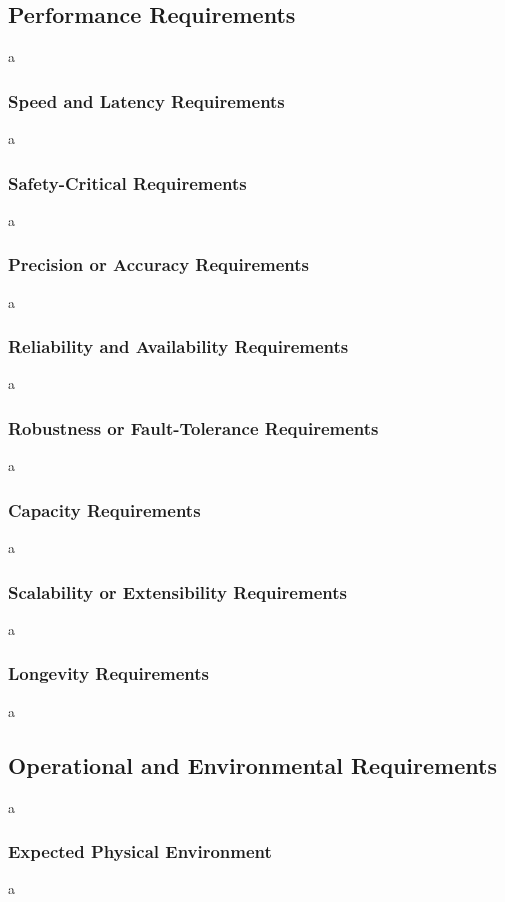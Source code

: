 \documentclass[12pt]{article}
\begin{document}
\subsection{Performance Requirements}
a

\subsubsection{Speed and Latency Requirements}
a

\subsubsection{Safety-Critical Requirements}
a

\subsubsection{Precision or Accuracy Requirements}
a

\subsubsection{Reliability and Availability Requirements}
a

\subsubsection{Robustness or Fault-Tolerance Requirements}
a

\subsubsection{Capacity Requirements}
a

\subsubsection{Scalability or Extensibility Requirements}
a

\subsubsection{Longevity Requirements}
a

\subsection{Operational and Environmental Requirements}
a

\subsubsection{Expected Physical Environment}
a
\end{document}
